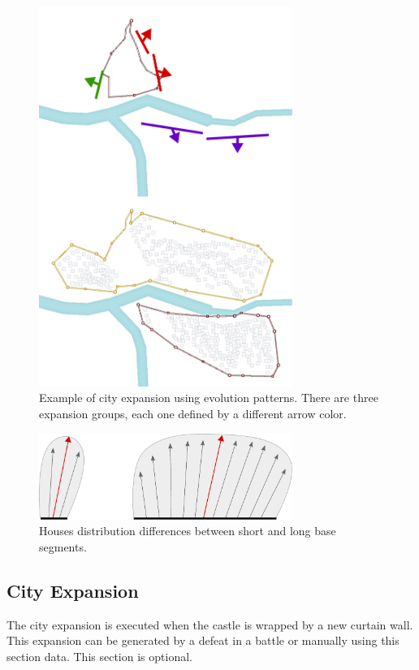 \documentclass[tog]{acmsiggraph}
\begin{document}
\begin{figure}[hp]
  \centering
  \includegraphics[width=3.25in]{figs/cityevolution_patterns}
  \caption{Example of city expansion using evolution patterns. There are three expansion groups, each one defined by a different arrow color.}
  \label{fig:cityevolution_patterns}
\end{figure}





 
\begin{figure}[hp]
  \centering
  \includegraphics[width=3.25in]{figs/cityevolution_patterns2}
  \caption{Houses distribution differences between short and long base segments. }
  \label{fig:cityevolution_patterns2}
\end{figure}


 
\subsection{City Expansion}
\label{sec:cityexpansion}

The city expansion is executed when the castle is wrapped by a new curtain wall. 
This expansion can be generated by a defeat in a battle or manually using this section data.
This section is optional.
\end{document}
